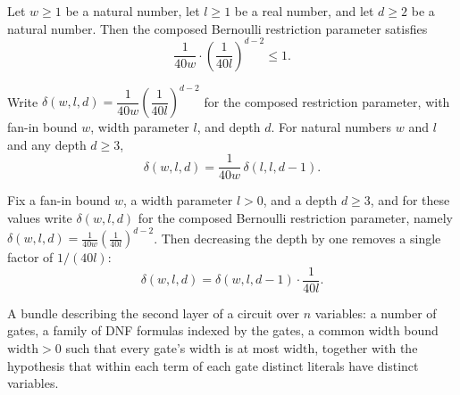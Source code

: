 \begin{lemma}
\label{LMN.composedDelta_le_one}
\leanok
{}
Let $w \ge 1$ be a natural number, let $l \ge 1$ be a real number, and let $d \ge 2$ be
a natural number. Then the composed Bernoulli restriction parameter satisfies
\[
  \frac{1}{40w}\cdot\left(\frac{1}{40l}\right)^{d-2} \le 1.
\]
\end{lemma}

\begin{lemma}
\label{LMN.composedDelta_step}
\leanok
{}
Write $\delta(w,l,d) = \dfrac{1}{40w}\left(\dfrac{1}{40l}\right)^{d-2}$ for the composed
restriction parameter, with fan-in bound $w$, width parameter $l$, and depth $d$. For
natural numbers $w$ and $l$ and any depth $d \ge 3$,
\[
  \delta(w,l,d) = \frac{1}{40w}\,\delta(l,l,d-1).
\]
\end{lemma}

\begin{lemma}
\label{LMN.composedDelta_step_right}
\leanok
{}
Fix a fan-in bound $w$, a width parameter $l > 0$, and a depth $d \ge 3$, and for these
values write $\delta(w,l,d)$ for the composed Bernoulli restriction parameter, namely
$\delta(w,l,d) = \frac{1}{40w}\left(\frac{1}{40l}\right)^{d-2}$. Then decreasing the
depth by one removes a single factor of $1/(40l)$:
\[
  \delta(w,l,d) = \delta(w,l,d-1)\cdot\frac{1}{40l}.
\]
\end{lemma}

\begin{definition}
\label{LMN.Layer2Data}
\leanok
{}
A bundle describing the second layer of a circuit over $n$ variables: a number of gates,
a family of DNF formulas indexed by the gates, a common width bound $\mathrm{width}>0$ such
that every gate's width is at most $\mathrm{width}$, together with the hypothesis that within
each term of each gate distinct literals have distinct variables.
\end{definition}

